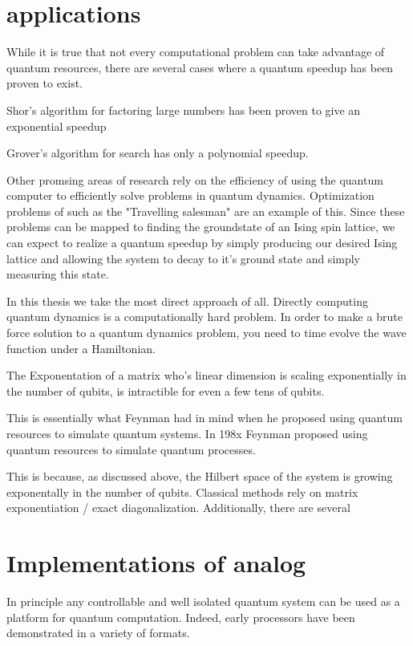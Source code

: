 \section{applications}
While it is true that not every computational problem can take advantage of quantum resources, there are several cases where a quantum speedup has been proven to exist.

Shor's algorithm for factoring large numbers has been proven to give an exponential speedup

Grover's algorithm for search has only a polynomial speedup.

Other promsing areas of research rely on the efficiency of using the quantum computer to efficiently solve problems in quantum dynamics.
Optimization problems of such as the "Travelling salesman" are an example of this.  Since these problems can be mapped to finding the groundstate of an Ising spin lattice,
we can expect to realize a quantum speedup by simply producing our desired Ising lattice and allowing the system to decay to it's ground state and simply measuring this state.

In this thesis we take the most direct approach of all.
Directly computing quantum dynamics is a computationally hard problem.
In order to make a brute force solution to a quantum dynamics problem, you need to time evolve the wave function under a Hamiltonian.


The Exponentation of a matrix who's linear dimension is scaling exponentially in the number of qubits, is intractible for even a few tens of qubits.

This is essentially what Feynman had in mind when he proposed using quantum resources to simulate quantum systems.
In 198x Feynman proposed using quantum resources to simulate quantum processes.



This is because, as discussed above, the Hilbert space of the system is growing exponentally in the number of qubits.
Classical methods rely on matrix exponentiation / exact diagonalization.
Additionally, there are several

\section{Implementations of analog}
In principle any controllable and well isolated quantum system can be used as a platform for quantum computation.
Indeed, early processors have been demonstrated in a variety of formats.

